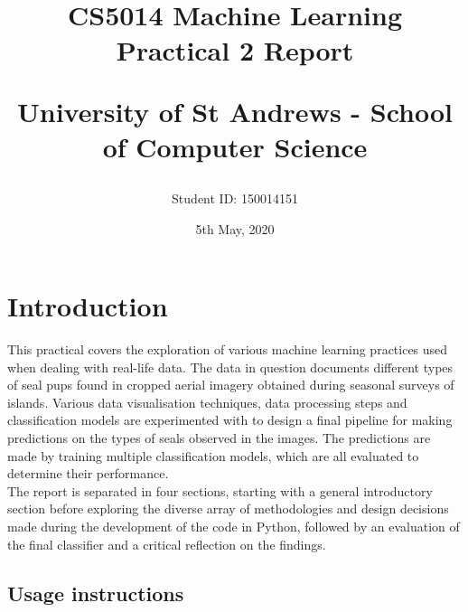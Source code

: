 \documentclass[letterpaper,12pt]{article}
\begin{document}
\title{
    CS5014 Machine Learning\\Practical 2 Report\\
    \begin{large}
    University of St Andrews - School of Computer Science
    \end{large}
}
\author{Student ID: 150014151}
\date{5th May, 2020}
\maketitle
\newpage

\tableofcontents
\newpage


\section{Introduction}
\label{sec:introduction}

This practical covers the exploration of various machine learning practices used when dealing with real-life data. The data in question documents different types of seal pups found in cropped aerial imagery obtained during seasonal surveys of islands. Various data visualisation techniques, data processing steps and classification models are experimented with to design a final pipeline for making predictions on the types of seals observed in the images. The predictions are made by training multiple classification models, which are all evaluated to determine their performance.\\

The report is separated in four sections, starting with a general introductory section before exploring the diverse array of methodologies and design decisions made during the development of the code in Python, followed by an evaluation of the final classifier and a critical reflection on the findings.

\subsection{Usage instructions}
\end{document}
